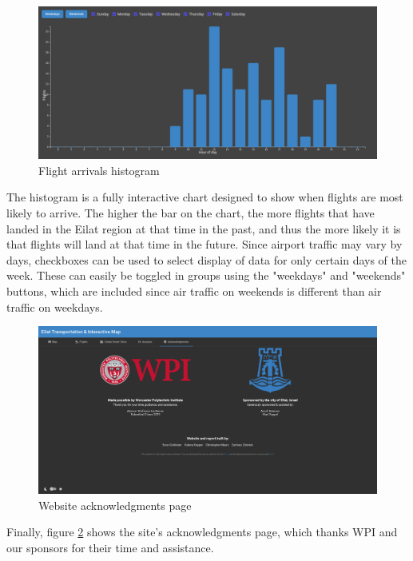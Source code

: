 \documentclass[12pt]{article}                               %
\begin{document}
\newpage
\begin{figure}[H]
    \centering
    \includegraphics[width=1\textwidth]{images/site_flights_graph.png}
    \caption{Flight arrivals histogram}
    \label{img:site_flights_histogram}
\end{figure}

The histogram is a fully interactive chart designed to show when flights are most likely to arrive. The higher the bar on the chart, the more flights that have landed in the Eilat region at that time in the past, and thus the more likely it is that flights will land at that time in the future. Since airport traffic may vary by days, checkboxes can be used to select display of data for only certain days of the week. These can easily be toggled in groups using the "weekdays" and "weekends" buttons, which are included since air traffic on weekends is different than air traffic on weekdays.

\begin{figure}[H]
    \centering
    \includegraphics[width=1\linewidth]{images/site_about.png}
    \caption{Website acknowledgments page}
    \label{img:site_about}
\end{figure}

Finally, figure \ref{img:site_about} shows the site's acknowledgments page, which thanks WPI and our sponsors for their time and assistance.
\end{document}
